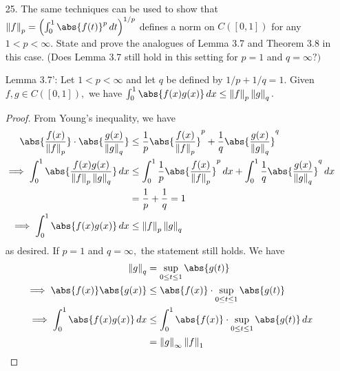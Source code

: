 \documentclass{article}
\begin{document}
\begin{itemize}
	\item[25.] The same techniques can be used to show that $\left\lVert f \right\rVert_p = \left( \int_0^1 \abs{f(t)}^p\, dt \right)^{1/p}$ defines a norm on $C\left( [0, 1] \right)$ for any $1<p<\infty.$ State and prove the analogues of Lemma 3.7 and Theorem 3.8 in this case. (Does Lemma 3.7 still hold in this setting for $p=1$ and $q=\infty?)$

		Lemma 3.7': Let $1<p<\infty$ and let $q$ be defined by $1/p+1/q=1.$ Given $f, g\in C([0, 1]),$ we have $\int_0^1 \abs{f(x)g(x)}\, dx\le \left\lVert f \right\rVert_p\left\lVert g \right\rVert_q.$
		\begin{proof}
			From Young's inequality, we have
			\begin{align*}
				\abs{\frac{f(x)}{\left\lVert f \right\rVert_p}}\cdot \abs{\frac{g(x)}{\left\lVert g \right\rVert_q}} &\le \frac{1}{p} \abs{ \frac{f(x)}{\left\lVert f \right\rVert_p}}^p+\frac{1}{q}\abs{\frac{g(x)}{\left\lVert g \right\rVert_q}}^q \\
				\implies \int_0^1 \abs{\frac{f(x)g(x)}{\left\lVert f \right\rVert_p\left\lVert g \right\rVert_q}}\, dx &\le \int_0^1 \frac{1}{p} \abs{\frac{f(x)}{\left\lVert f \right\rVert_p}}^p\, dx + \int_0^1 \frac{1}{q} \abs{\frac{g(x)}{\left\lVert g \right\rVert_q}}^q\, dx \\
				&= \frac{1}{p} + \frac{1}{q} = 1 \\
				\implies \int_0^1 \abs{f(x)g(x)}\, dx &\le \left\lVert f \right\rVert_p\left\lVert g \right\rVert_q
			\end{align*}
			as desired. If $p=1$ and $q=\infty,$ the statement still holds. We have
			\begin{align*}
				\left\lVert g \right\rVert_q &= \sup_{0\le t\le 1} \abs{g(t)} \\
				\implies \abs{f(x)}\abs{g(x)} &\le \abs{f(x)} \cdot\sup_{0\le t\le 1} \abs{g(t)} \\
				\implies \int_0^1\abs{f(x)g(x)}\, dx &\le \int_0^1\abs{f(x)}\cdot \sup_{0\le t\le 1}\abs{g(t)}\, dx \\
				&= \left\lVert g \right\rVert_\infty \left\lVert f \right\rVert_1
			\end{align*}
		\end{proof}


\end{itemize}
\end{document}
